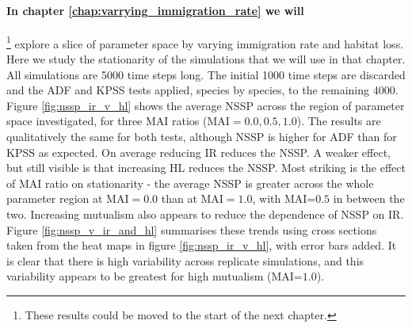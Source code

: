 \paragraph*{In chapter \ref{chap:varrying_immigration_rate} we will}\footnote{These results could be moved to the start of the next chapter.} explore a slice of parameter space by varying immigration rate and habitat loss. Here we study the stationarity of the simulations that we will use in that chapter. All simulations are 5000 time steps long. The initial 1000 time steps are discarded and the ADF and KPSS tests applied, species by species, to the remaining 4000. Figure \ref{fig:nssp_ir_v_hl} shows the average NSSP across the region of parameter space investigated, for three MAI ratios (MAI$=0.0,0.5,1.0$). The results are qualitatively the same for both tests, although NSSP is higher for ADF than for KPSS as expected. On average reducing IR reduces the NSSP. A weaker effect, but still visible is that increasing HL reduces the NSSP. Most striking is the effect of MAI ratio on stationarity - the average NSSP is greater across the whole parameter region at MAI$=0.0$ than at MAI$=1.0$, with MAI=$0.5$ in between the two. Increasing mutualism also appears to reduce the dependence of NSSP on IR.  Figure \ref{fig:nssp_v_ir_and_hl} summarises these trends using cross sections taken from the heat maps in figure \ref{fig:nssp_ir_v_hl}, with error bars added. It is clear that there is high variability across replicate simulations, and this variability appears to be greatest for high mutualism (MAI=$1.0$).

